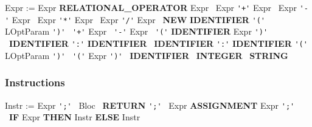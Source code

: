 \documentclass[12pt,a4paper]{article}
\begin{document}
{\sffamily
Expr := Expr \textbf{RELATIONAL\_OPERATOR} Expr \newline
\hspace*{1em} \textbar \ Expr \verb|'+'| Expr \newline
\hspace*{1em} \textbar \ Expr \verb|'-'| Expr \newline
\hspace*{1em} \textbar \ Expr \verb|'*'| Expr \newline
\hspace*{1em} \textbar \ Expr \verb|'/'| Expr \newline
\hspace*{1em} \textbar \ \textbf{NEW} \textbf{IDENTIFIER} \verb|'('| LOptParam \verb|')'| \newline
\hspace*{1em} \textbar \ \verb|'+'| Expr \newline
\hspace*{1em} \textbar \ \verb|'-'| Expr \newline
\hspace*{1em} \textbar \ \verb|'('| \textbf{IDENTIFIER} Expr \verb|')'| \newline
\hspace*{1em} \textbar \ \textbf{IDENTIFIER} \verb|':'| \textbf{IDENTIFIER} \newline
\hspace*{1em} \textbar \ \textbf{IDENTIFIER} \verb|':'| \textbf{IDENTIFIER} \verb|'('| LOptParam \verb|')'| \newline
\hspace*{1em} \textbar \ \verb|'('| Expr \verb|')'| \newline
\hspace*{1em} \textbar \ \textbf{IDENTIFIER} \newline
\hspace*{1em} \textbar \ \textbf{INTEGER} \newline
\hspace*{1em} \textbar \ \textbf{STRING}
}

\subsubsection{Instructions}

{\sffamily
Instr := Expr \verb|';'| \newline
\hspace*{1em} \textbar \ Bloc \newline
\hspace*{1em} \textbar \ \textbf{RETURN} \verb|';'| \newline
\hspace*{1em} \textbar \ Expr \textbf{ASSIGNMENT} Expr \verb|';'| \newline
\hspace*{1em} \textbar \ \textbf{IF} Expr \textbf{THEN} Instr \textbf{ELSE} Instr
}
\end{document}
